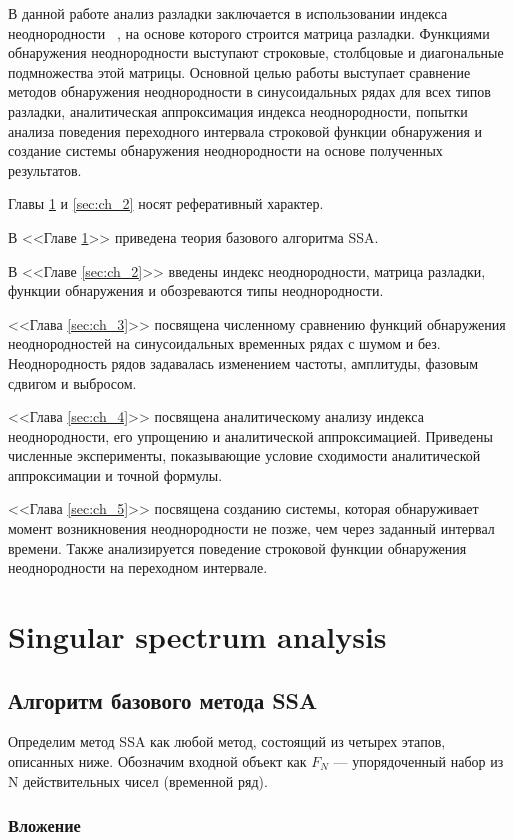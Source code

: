 \documentclass[specialist, substylefile = spbu.rtx,
			   subf, href, 12pt]{disser}
\begin{document}
В данной работе анализ разладки заключается в использовании индекса неоднородности ~\cite{Golyandina2001}, на основе которого строится матрица разладки. Функциями обнаружения неоднородности выступают строковые, столбцовые и диагональные подмножества этой матрицы. Основной целью работы выступает сравнение методов обнаружения неоднородности в синусоидальных рядах для всех типов разладки, аналитическая аппроксимация индекса неоднородности, попытки анализа поведения переходного интервала строковой функции обнаружения и создание системы обнаружения неоднородности на основе полученных результатов.

Главы \ref{sec:ch_1} и \ref{sec:ch_2} носят реферативный характер.

В <<Главе \ref{sec:ch_1}>> приведена теория базового алгоритма SSA.

В <<Главе \ref{sec:ch_2}>> введены индекс неоднородности, матрица разладки, функции обнаружения и обозреваются типы неоднородности.

<<Глава \ref{sec:ch_3}>> посвящена численному сравнению функций обнаружения неоднородностей на синусоидальных временных рядах с шумом и без. Неоднородность рядов задавалась изменением частоты, амплитуды, фазовым сдвигом и выбросом.

<<Глава \ref{sec:ch_4}>> посвящена аналитическому анализу индекса неоднородности, его упрощению и аналитической аппроксимацией. Приведены численные эксперименты, показывающие условие сходимости аналитической аппроксимации и точной формулы.

<<Глава \ref{sec:ch_5}>> посвящена созданию системы, которая обнаруживает момент возникновения неоднородности не позже, чем через заданный интервал времени. Также анализируется поведение строковой функции обнаружения неоднородности на переходном интервале.



\newpage
\chapter{Singular spectrum analysis} \label{sec:ch_1}
\section{Алгоритм базового метода SSA}
Определим метод SSA как любой метод, состоящий из четырех этапов, описанных ниже. Обозначим входной объект как $F_N$ --- упорядоченный набор из $\mathrm{N}$ действительных чисел (временной ряд).

\subsection{Вложение}
\label{step:Embedding}
\end{document}
